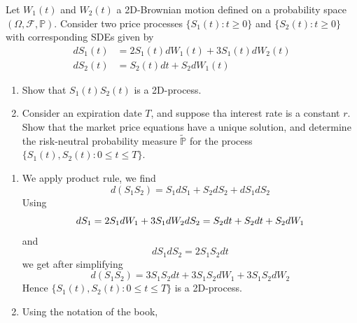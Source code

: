 \documentclass[12pt,a4paper]{exam}
\begin{document}
\begin{questions}
\begin{solution}
\begin{solution}
\question Let $W_1(t)$ and $W_2(t)$ a 2D-Brownian motion defined on a probability space $(\Omega, \mathcal{F}, \mathbb{P})$. Consider two price processes $\{S_1(t):t\geq 0\}$ and $\{S_2(t):t\geq 0\}$ with corresponding SDEs given by
\begin{equation*}
\begin{aligned}
dS_1(t) &= 2S_1(t)dW_1(t) + 3S_1(t)dW_2(t)\\
dS_2(t) &= S_2(t)dt + S_2dW_1(t)
\end{aligned}
\end{equation*}
\begin{enumerate}[label=(\alph*),font=\itshape]
\item Show that $S_1(t)S_2(t)$ is a 2D-\ito process.
\item Consider an expiration date $T$, and suppose tha interest rate is a constant $r$. Show that the market price equations have a unique solution, and determine the risk-neutral probability measure $\tilde{\mathbb{P}}$ for the process $\{S_1(t),S_2(t):0\leq t\leq T\}$.
\end{enumerate}
\fillwithlines{3cm}
\begin{solution}
\begin{enumerate}[label=(\alph*),font=\itshape]
\item We apply \ito product rule, we find
\begin{equation*}
d(S_1S_2) = S_1dS_1+S_2dS_2+dS_1 dS_2
\end{equation*}
Using 
\begin{equation*}
dS_1 = 2S_1dW_1+3S_1dW_2 \\
dS_2 = S_2dt +S_2dt +S_2dW_1
\end{equation*}
and
\begin{equation*}
dS_1 dS_2 = 2S_1 S_2 dt 
\end{equation*}
we get after simplifying
\begin{equation*}
d(S_1 S_2) = 3S_1 S_2 dt + 3S_1S_2dW_1 + 3S_1S_2dW_2 
\end{equation*}
Hence  $\{S_1(t),S_2(t):0\leq t\leq T\}$ is a 2D-\ito process.
\item Using the notation of the book, 
%

\end{enumerate}
\end{solution}
\end{solution}
\end{solution}
\end{questions}
\end{document}
